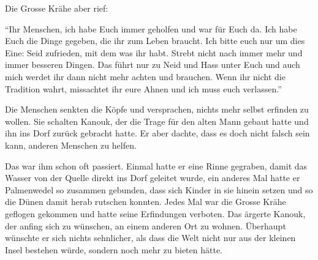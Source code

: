 Die Grosse Krähe aber rief: 

\enquote{Ihr Menschen, ich habe Euch immer geholfen und war für Euch da. Ich habe Euch die Dinge gegeben, die ihr zum Leben braucht. Ich bitte euch nur um dies Eine: Seid zufrieden, mit dem was ihr habt. Strebt nicht nach immer mehr und immer besseren Dingen. Das führt nur zu Neid und Hass unter Euch und auch mich werdet ihr dann nicht mehr achten und brauchen. Wenn ihr nicht die Tradition wahrt, missachtet ihr eure Ahnen und  ich muss euch verlassen.} 

Die Menschen senkten die Köpfe und versprachen, nichts mehr selbst erfinden zu wollen. Sie schalten Kanouk, der die Trage für den alten Mann gebaut hatte und ihn ins Dorf zurück gebracht hatte. Er aber dachte, dass es doch nicht falsch sein kann, anderen Menschen zu helfen.

Das war ihm schon oft passiert. Einmal hatte er eine Rinne gegraben, damit das
Wasser von der Quelle direkt ins Dorf geleitet wurde, ein anderes Mal hatte er
Palmenwedel so zusammen gebunden, dass sich Kinder in sie hinein setzen und so
die Dünen damit herab rutschen konnten. Jedes Mal war die Grosse Krähe geflogen
gekommen und hatte seine Erfindungen verboten. Das ärgerte Kanouk, der anfing
sich zu wünschen, an einem anderen Ort zu wohnen. Überhaupt wünschte er sich nichts sehnlicher, als dass die Welt nicht nur aus der kleinen Insel bestehen würde, sondern noch mehr zu bieten hätte.



